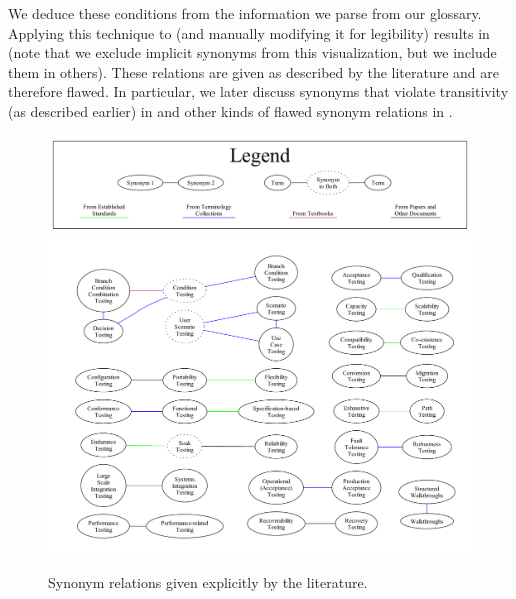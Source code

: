 \ifnotpaper
    We deduce these conditions from the information we parse from our
    glossary.
    Applying this technique to \ourApproachGlossary{} (and manually modifying
    it for legibility) results in  (note that we exclude
    implicit synonyms from this visualization, but we include them in others).
    These relations are given as described by the literature and are therefore
    flawed. In particular, we later discuss synonyms that violate transitivity
    (as described earlier) in  and other kinds of flawed
    synonym relations in .

    \begin{figure}[tb!]
        \centering
        \includegraphics[width=\textwidth]{assets/graphs/manual/expSynLegend.pdf}
        \includegraphics[width=\textwidth]{assets/graphs/manual/expSynGraph.pdf}
        \caption{Synonym relations given explicitly by the literature.}
        \label{fig:expSynGraph}
    \end{figure}

